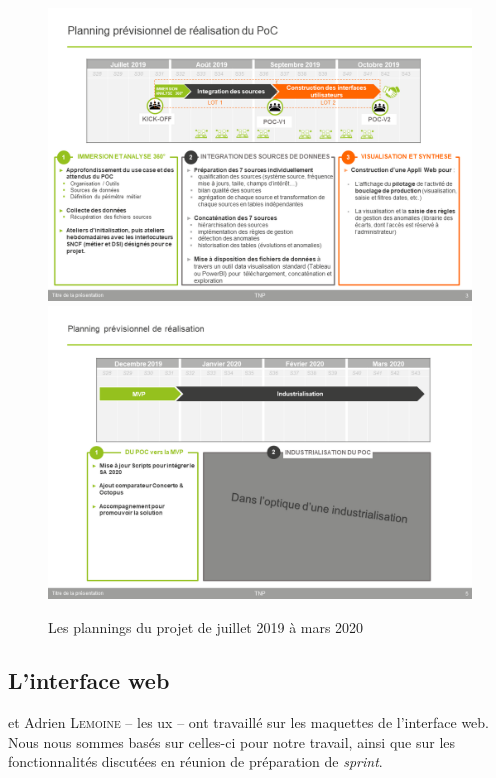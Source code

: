   \begin{figure}[H]
    \centering
    \includegraphics[width=0.8\linewidth]{img/planning-juillet-octobre-2019.png}
    \includegraphics[width=0.8\linewidth]{img/planning-decembre-mars-2020-MVP.png}
    \caption{Les plannings du projet de juillet 2019 à mars 2020}
  \end{figure}

\newpage
\subsection{L'interface web}

\stefan et Adrien \textsc{Lemoine} -- les \gls{ux} -- ont travaillé sur les maquettes de l'interface web. Nous nous sommes basés sur celles-ci pour notre travail, ainsi que sur les fonctionnalités discutées en réunion de préparation de \textit{sprint}.

